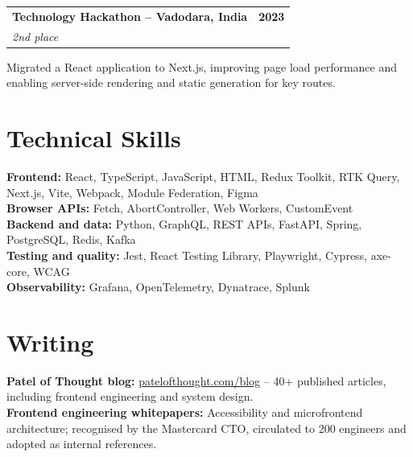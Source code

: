 \documentclass[letterpaper,10pt]{article}
\makeatletter
\newcommand{\resumeHackathon}[3]{%
  \noindent\begin{tabular*}{\textwidth}{@{}l@{\extracolsep{\fill}}r@{}}
    \textbf{#1} & \textbf{#2}\\[-1pt]
    \textit{#3} &
  \end{tabular*}\vspace{-2pt}
}
\makeatother
\begin{document}
\resumeHackathon{Technology Hackathon -- Vadodara, India}{2023}{2nd place}
Migrated a React application to Next.js, improving page load performance and enabling server-side rendering and static generation for key routes.

\section{Technical Skills}
\textbf{Frontend:} React, TypeScript, JavaScript, HTML, Redux Toolkit, RTK Query, Next.js, Vite, Webpack, Module Federation, Figma\\
\textbf{Browser APIs:} Fetch, AbortController, Web Workers, CustomEvent\\
\textbf{Backend and data:} Python, GraphQL, REST APIs, FastAPI, Spring, PostgreSQL, Redis, Kafka\\
\textbf{Testing and quality:} Jest, React Testing Library, Playwright, Cypress, axe-core, WCAG\\
\textbf{Observability:} Grafana, OpenTelemetry, Dynatrace, Splunk

\section{Writing}
\textbf{Patel of Thought blog:} \href{https://patelofthought.com/blog}{patelofthought.com/blog} -- 40+ published articles, including frontend engineering and system design.\\
\textbf{Frontend engineering whitepapers:} Accessibility and microfrontend architecture; recognised by the Mastercard CTO, circulated to 200 engineers and adopted as internal references.
\end{document}
